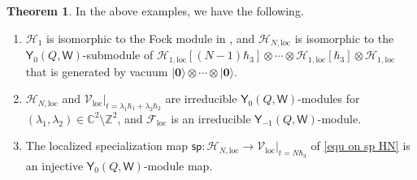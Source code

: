 \documentclass[10pt]{amsart}
\theoremstyle{definition}
\newtheorem{Theorem}{Theorem}[section]
\numberwithin{equation}{section}
\newcommand{\bC}{\mathbb{C}}
\newcommand{\bZ}{\mathbb{Z}}
\newcommand{\cF}{\mathcal{F}}
\newcommand{\cH}{\mathcal{H}}
\newcommand{\cV}{\mathcal{V}}
\newcommand{\loc}{\mathrm{loc}}
\newcommand{\sW}{\mathsf{W}}
\begin{document}
\begin{Theorem}\label{prop on 3 modules of gl1hat}
In the above examples, we have the following.
\begin{enumerate}
    \item[(a)] $\cH_1$ is isomorphic to the Fock module in \cite[\S 13.1]{MO}, and $\cH_{N,\loc}$ is isomorphic to the $\mathsf Y_{0}(Q,\sW)$-submodule of $\cH_{1,\loc}[(N-1)\hbar_3]\otimes\cdots\otimes \cH_{1,\loc}[\hbar_3]\otimes \cH_{1,\loc}$ that is generated by vacuum $|\mathbf 0\rangle\otimes\cdots\otimes |\mathbf 0\rangle$.
    \item[(b)] $\cH_{N,\loc}$ and $\cV_\loc|_{t=\lambda_1\hbar_1+\lambda_2\hbar_2}$ are irreducible $\mathsf Y_{0}(Q,\sW)$-modules for $(\lambda_1,\lambda_2)\in \bC^2\setminus\bZ^2$, and $\cF_\loc$ is an irreducible $\mathsf Y_{-1}(Q,\sW)$-module.
    \item[(c)] The localized specialization map $\mathsf{sp}\colon \cH_{N,\loc}\to \cV_\loc|_{t=N\hbar_3}$ of \eqref{equ on sp HN}  
    is an injective $\mathsf Y_{0}(Q,\sW)$-module map.
\end{enumerate}
\end{Theorem}
\end{document}
